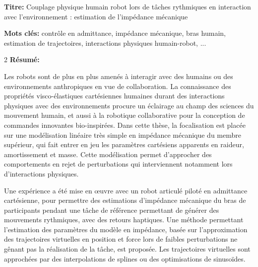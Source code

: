 \documentclass[french,12pt,a4paper]{book}
\begin{document}
\fontsize{10}{12}\selectfont

\begin{mdframed}[linecolor=Prune,linewidth=1]

\textbf{Titre:} Couplage physique humain robot lors de tâches rythmiques en interaction avec l’environnement : estimation de l’impédance mécanique

\vspace{.25cm}
\noindent \textbf{Mots clés:} contrôle en admittance, impédance mécanique, bras humain, estimation de trajectoires, interactions physiques humain-robot, ...

\vspace{-.5cm}
\begin{multicols}{2}
\noindent \textbf{Résumé:}

Les robots sont de plus en plus amenés à interagir avec des humains ou des environnements anthropiques en vue de collaboration.
La connaissance des propriétés visco-élastiques cartésiennes humaines durant des interactions physiques avec des environnements procure %
un éclairage au champ des sciences du mouvement humain, et aussi à la robotique collaborative pour la conception de commandes innovantes bio-inspirées.
Dans cette thèse, la focalisation est placée sur une modélisation linéaire très simple en impédance mécanique du membre supérieur, qui fait entrer en jeu les paramètres cartésiens apparents en raideur, amortissement et masse. 
Cette modélisation permet d'approcher des comportements en rejet de perturbations qui interviennent notamment lors d'interactions physiques.

Une expérience a été mise en œuvre avec un robot articulé piloté en admittance cartésienne, pour permettre des estimations d’impédance mécanique du bras de participants pendant une tâche de référence permettant de générer des mouvements rythmiques, avec des retours haptiques. 
Une méthode permettant l’estimation des paramètres du modèle en impédance, basée sur l’approximation des trajectoires virtuelles en position et force lors de faibles perturbations ne gênant pas la réalisation de la tâche, est proposée. 
Les trajectoires virtuelles sont approchées par des interpolations de splines ou des optimisations de sinusoïdes.


\end{multicols}
\end{mdframed}
\end{document}

